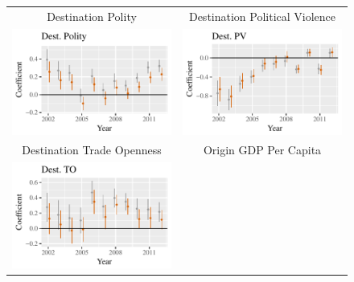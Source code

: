 \documentclass[12pt]{article}
\begin{document}
\begin{figure}[htp]
\centering
\begin{tabular}{c@{\hskip -.4cm}c}
Destination Polity &
Destination Political Violence\\
\includegraphics[height=.22\textheight, clip=true, trim=0cm .5cm 0cm .1cm]{draft_figures/rl_plots/DestPolity.pdf}    &
\includegraphics[height=.22\textheight, clip=true, trim=.5cm .5cm 0cm .1cm]{draft_figures/rl_plots/DestPV.pdf}   \\
Destination Trade Openness &
Origin GDP Per Capita\\
\includegraphics[height=.22\textheight, clip=true, trim=0cm .5cm 0cm .1cm]{draft_figures/rl_plots/DestTO.pdf} &

\end{tabular}
\end{figure}
\end{document}
